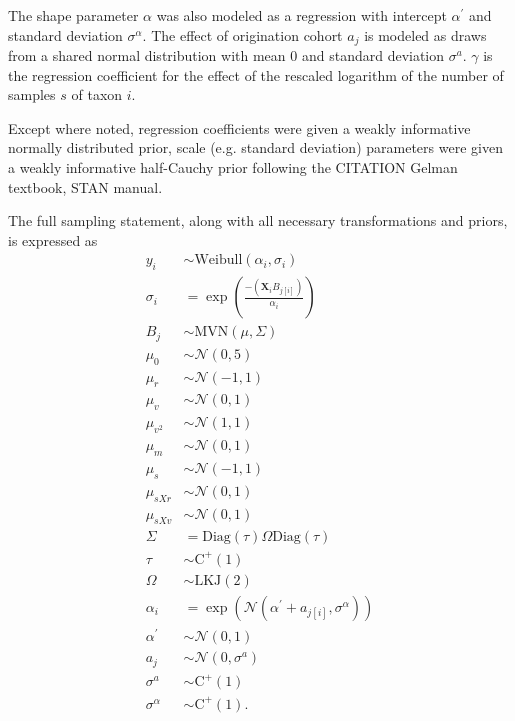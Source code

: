 \documentclass{article}
\begin{document}
The shape parameter \(\alpha\) was also modeled as a regression with intercept \(\alpha^{\prime}\) and standard deviation \(\sigma^{\alpha}\). The effect of origination cohort \(a_{j}\) is modeled as draws from a shared normal distribution with mean 0 and standard deviation \(\sigma^{a}\). \(\gamma\) is the regression coefficient for the effect of the rescaled logarithm of the number of samples \(s\) of taxon \(i\).

Except where noted, regression coefficients were given a weakly informative normally distributed prior, scale (e.g. standard deviation) parameters were given a weakly informative half-Cauchy prior following the CITATION Gelman textbook, STAN manual. 

The full sampling statement, along with all necessary transformations and priors, is expressed as
\begin{equation}
  \begin{aligned}
    y_{i} &\sim \mathrm{Weibull}(\alpha_{i}, \sigma_{i}) \\
    \sigma_{i} &= \exp\left(\frac{-(\mathbf{X}_{i} B_{j[i]})}{\alpha_{i}}\right) \\
    B_{j} &\sim \mathrm{MVN}(\mu, \Sigma) \\
    \mu_{0} &\sim \mathcal{N}(0, 5) \\
    \mu_{r} &\sim \mathcal{N}(-1, 1) \\
    \mu_{v} &\sim \mathcal{N}(0, 1) \\
    \mu_{v^{2}} &\sim \mathcal{N}(1, 1) \\
    \mu_{m} &\sim \mathcal{N}(0, 1) \\
    \mu_{s} &\sim \mathcal{N}(-1, 1) \\
    \mu_{sXr} &\sim \mathcal{N}(0, 1) \\
    \mu_{sXv} &\sim \mathcal{N}(0, 1) \\
    \Sigma &= \text{Diag}(\tau) \Omega \text{Diag}(\tau) \\
    \tau &\sim \mathrm{C^{+}}(1) \\
    \Omega &\sim \text{LKJ}(2) \\
    \alpha_{i} &= \exp\left(\mathcal{N}(\alpha^{\prime} + a_{j[i]}, \sigma^{\alpha})\right) \\
    \alpha^{\prime} &\sim \mathcal{N}(0, 1) \\
    a_{j} &\sim \mathcal{N}(0, \sigma^{a}) \\
    \sigma^{a} &\sim \mathrm{C^{+}}(1) \\
    \sigma^{\alpha} &\sim \mathrm{C^{+}}(1). \\
  \end{aligned}
  \label{eq:wei_total}
\end{equation}
\end{document}

